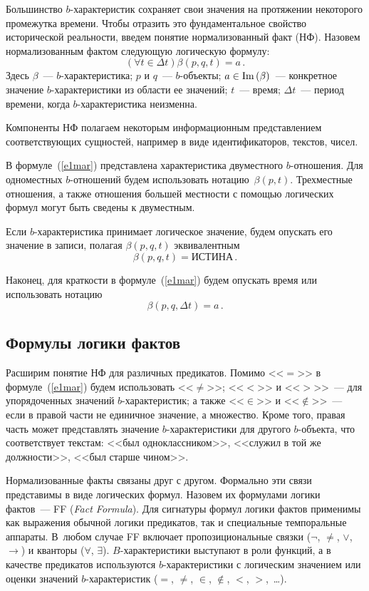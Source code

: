 \begin{multicols}{2}
  Большинство $b$-характеристик сохраняет свои значения на протяжении 
некоторого промежутка времени.  Чтобы отразить это 
фундаментальное свойство исторической реальности, введем понятие 
нормализованный факт (НФ). Назовем нормализованным фактом  следующую 
логическую формулу:
  \begin{equation}
  \left( \forall t\in \Delta t\right) \beta(p,q,t)=a\,.
  \label{e1mar}
  \end{equation}
  Здесь 
  $\beta$~--- $b$-характеристика;
  $p$ и $q$~--- $b$-объекты;
  $a\hm\in  \mathrm{Im}\left(\beta\right)$~--- конкретное значение $b$-характеристики из области 
ее значений;
  $t$~--- время;
  $\Delta t$~--- период времени, когда $b$-характеристика неизменна.
  
  Компоненты НФ полагаем некоторым информационным представлением 
соответствующих сущностей, например в виде идентификаторов, текстов, 
чисел.
  
  В формуле~(\ref{e1mar}) представлена характеристика двуместного 
  $b$-от\-но\-ше\-ния. Для одноместных $b$-от\-но\-ше\-ний будем использовать 
нотацию~$\beta (p, t)$. Трехместные отношения, а также отношения большей 
местности с помощью логических формул могут быть сведены к двуместным.
  
  Если $b$-характеристика принимает логическое значение, будем опускать 
его значение в записи, полагая $\beta (p, q, t)$ эквивалентным 
$$\beta (p, q, t) = \mbox{ИСТИНА}\,.
$$ 

Наконец, для краткости в формуле~(\ref{e1mar}) 
будем опускать время или использовать нотацию 
$$
\beta (p, q, \Delta t) = a\,.
$$ 

\subsection{Формулы логики фактов}
  
  Расширим понятие НФ для различных предикатов. Помимо <<$=$>> в 
формуле~(\ref{e1mar}) будем использовать <<$\not=$>>; <<$<$>> и 
  <<$>$>>~--- для упорядоченных значений\linebreak
   $b$-ха\-рак\-те\-ри\-стик; а также 
<<$\in$>> и <<$\not\in$>>~--- если в правой части не единичное значение, а 
множество. Кроме того, правая часть может представлять значение 
  $b$-характеристики для другого $b$-объекта, что соответствует текстам: 
<<был одноклассником>>, <<служил в той же должности>>, <<был старше 
чином>>.
  
  Нормализованные факты связаны друг с другом. Формально эти связи представимы в виде 
логических формул. Назовем их формулами логики фактов~--- FF 
(\textit{Fact Formula}). Для сигнатуры формул логики фактов применимы как 
выражения обычной логики предикатов, так и специальные темпоральные 
аппараты. В~любом случае FF включает пропозициональные связки ($\lnot$, 
$\neq$, $\vee$, $\rightarrow$) и кванторы ($\forall$, $\exists$). 
  $B$-характеристики выступают в роли функций, а в качестве предикатов 
используются $b$-характеристики с логическим значением или оценки 
значений $b$-характеристик ($=$, $\not=$, $\in$, $\not\in$, $<$, $>$,\ \ldots).
  

\end{multicols}
